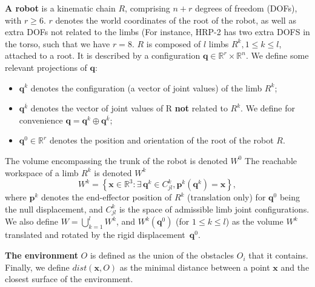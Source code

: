 \medskip
\textbf{A robot} is a kinematic chain $R$, comprising \mbox{$n + r$} degrees of freedom (DOFs), with $r \geq 6$. $r$ denotes the world coordinates of the root of the robot,
as well as extra DOFs not related to the limbs (For instance, HRP-2 has two extra DOFS in the torso, such that we have $r=8$. 
$R$ is composed of $l$ limbs $R^k, 1 \leq k \leq l$, attached to a root.
It is described by a configuration $\mathbf{q} \in  \mathbb{R}^r \times \mathbb{R}^n$.
We define some relevant projections of $\mathbf{q}$:
\begin{itemize}
	\item $\mathbf{q}^k$ denotes the configuration (a vector of joint values) of the limb $R^k$; %
	\item $\mathbf{q}^{\overline{k}}$ denotes the vector of joint values of R \textbf{not} related to $R^k$. We define for convenience \mbox{$\mathbf{q}= \mathbf{q}^k \oplus \mathbf{q}^{\overline{k}}$}; %
	\item $\mathbf{q}^{0}\in \mathbb{R}^r$ denotes the position and orientation of the root of the robot $R$.
\end{itemize}

\medskip
The volume encompassing the trunk of the robot is denoted $W^0$
 The reachable workspace of a limb $R^k$ is denoted $W^k$ %
\begin{equation}
  W^k = \left\{ {\mathbf{x} \in \mathbb{R}^3: \exists \, \mathbf{q}^k \in C^k_{jl}, \mathbf{p}^k(\mathbf{q}^k) = \mathbf{x} } \right\},
\end{equation}
where $\mathbf{p}^k$ denotes the end-effector position of $R^k$ (translation only) for $\mathbf{q}^0$ being the null displacement, and  $C^k_{jl}$ is the space
of admissible limb joint configurations. We also define $W = \bigcup_{k=1}^{l}W^k$, and
$W^k(\mathbf{q}^{0})$ (for $1 \leq k \leq l$) as the volume $W^k$ translated and rotated by the rigid displacement~$\mathbf{q}^{0}$.

\medskip
\textbf{The environment} $O$ is defined as the union of the obstacles $O_i$ that it contains.
Finally, we define $dist(\mathbf{x}, O)$ as the minimal distance between a point $\mathbf{x}$ and the closest surface of the environment.
